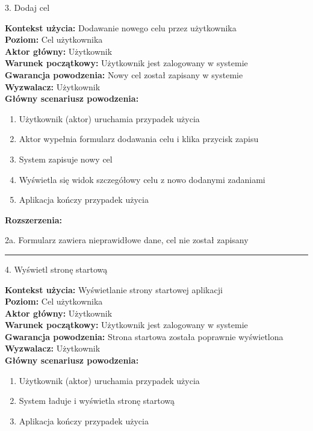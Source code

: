 {\noindent \bf{\small 3. Dodaj cel\par}}
\vspace{0.5cm}
{\noindent \bf Kontekst użycia: } Dodawanie nowego celu przez użytkownika\\
{\bf Poziom: } Cel użytkownika\\
{\bf Aktor główny: } Użytkownik\\
{\bf Warunek początkowy: } Użytkownik jest zalogowany w systemie\\
{\bf Gwarancja powodzenia: } Nowy cel został zapisany w systemie\\
{\bf Wyzwalacz: } Użytkownik\\
{\bf Główny scenariusz powodzenia: }
\begin{center}
    \begin{enumerate}
        \item Użytkownik (aktor) uruchamia przypadek użycia
        \item Aktor wypełnia formularz dodawania celu i klika przycisk zapisu
        \item System zapisuje nowy cel
        \item Wyświetla się widok szczegółowy celu z nowo dodanymi zadaniami
        \item Aplikacja kończy przypadek użycia
    \end{enumerate}
\end{center}
{\noindent \bf Rozszerzenia: }
\begin{center}
    \begin{description}
        \item{2a.} Formularz zawiera nieprawidłowe dane, cel nie został zapisany
    \end{description}
\end{center}

\noindent\rule{14cm}{0.1pt} %

{\noindent \bf{\small 4. Wyświetl stronę startową\par}}
\vspace{0.5cm}
{\noindent \bf Kontekst użycia: } Wyświetlanie strony startowej aplikacji\\
{\bf Poziom: } Cel użytkownika\\
{\bf Aktor główny: } Użytkownik\\
{\bf Warunek początkowy: } Użytkownik jest zalogowany w systemie\\
{\bf Gwarancja powodzenia: } Strona startowa została poprawnie wyświetlona\\
{\bf Wyzwalacz: } Użytkownik\\
{\bf Główny scenariusz powodzenia: }
\begin{center}
    \begin{enumerate}
        \item Użytkownik (aktor) uruchamia przypadek użycia
        \item System ładuje i wyświetla stronę startową
        \item Aplikacja kończy przypadek użycia
    \end{enumerate}
\end{center}

